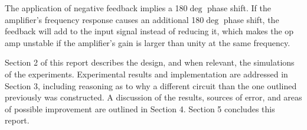 The application of negative feedback implies a 180$\deg$ phase shift. If the amplifier’s frequency response causes an additional 180$\deg$ phase shift, the feedback will add to the input signal instead of reducing it, which makes the op amp unstable if the amplifier’s gain is larger than unity at the same frequency. 

\noindent Section 2 of this report describes the design, and when relevant, the simulations of the experiments. Experimental results and implementation are addressed in Section 3, including reasoning as to why a different circuit than the one outlined previously was constructed. A discussion of the results, sources of error, and areas of possible improvement are outlined in Section 4. Section 5 concludes this report. \newline

 